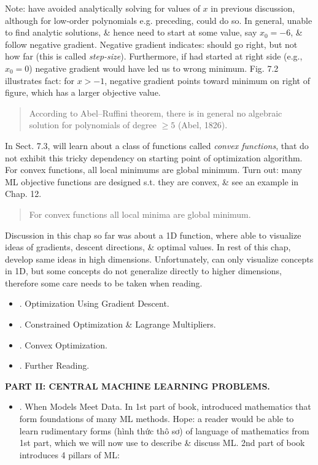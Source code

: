 \documentclass{article}
\begin{document}
\begin{enumerate}
\begin{itemize}
		Note: have avoided analytically solving for values of $x$ in previous discussion, although for low-order polynomials e.g. preceding, could do so. In general, unable to find analytic solutions, \& hence need to start at some value, say $x_0 = -6$, \& follow negative gradient. Negative gradient indicates: should go right, but not how far (this is called {\it step-size}). Furthermore, if had started at right side (e.g., $x_0 = 0$) negative gradient would have led us to wrong minimum. Fig. 7.2 illustrates fact: for $x > -1$, negative gradient points toward minimum on right of figure, which has a larger objective value.
		\begin{quote}
			According to Abel--Ruffini theorem, there is in general no algebraic solution for polynomials of degree $\ge5$ (Abel, 1826).
		\end{quote}
		In Sect. 7.3, will learn about a class of functions called {\it convex functions}, that do not exhibit this tricky dependency on starting point of optimization algorithm. For convex functions, all local minimums are global minimum. Turn out: many ML objective functions are designed s.t. they are convex, \& see an example in Chap. 12.
		\begin{quote}
			For convex functions all local minima are global minimum.
		\end{quote}
		Discussion in this chap so far was about a 1D function, where able to visualize ideas of gradients, descent directions, \& optimal values. In rest of this chap, develop same ideas in high dimensions. Unfortunately, can only visualize concepts in 1D, but some concepts do not generalize directly to higher dimensions, therefore some care needs to be taken when reading.
		\begin{itemize}
			\item {. Optimization Using Gradient Descent.}
			\item {. Constrained Optimization \& Lagrange Multipliers.}
			\item {. Convex Optimization.}
			\item {. Further Reading.}
		\end{itemize}
	\end{itemize}
	{\bf PART II: CENTRAL MACHINE LEARNING PROBLEMS.}
	\begin{itemize}
		\item {. When Models Meet Data.} In 1st part of book, introduced mathematics that form foundations of many ML methods. Hope: a reader would be able to learn rudimentary forms (hình thức thô sơ) of language of mathematics from 1st part, which we will now use to describe  \& discuss ML. 2nd part of book introduces 4 pillars of ML:

\end{itemize}
\end{enumerate}
\end{document}
